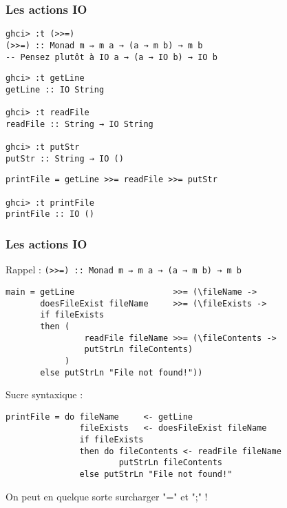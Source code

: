 \documentclass[10pt]{beamer}
\begin{document}
\begin{frame}[fragile]
\frametitle{Les actions IO}
\begin{verbatim}
ghci> :t (>>=)
(>>=) :: Monad m ⇒ m a → (a → m b) → m b
-- Pensez plutôt à IO a → (a → IO b) → IO b
\end{verbatim}
\pause
\begin{verbatim}
ghci> :t getLine
getLine :: IO String

ghci> :t readFile
readFile :: String → IO String

ghci> :t putStr
putStr :: String → IO ()
\end{verbatim}
\pause
\begin{verbatim}
printFile = getLine >>= readFile >>= putStr

ghci> :t printFile
printFile :: IO ()
\end{verbatim}
\end{frame}



\begin{frame}[fragile]
\frametitle{Les actions IO}

Rappel : \verb|(>>=) :: Monad m ⇒ m a → (a → m b) → m b|

\begin{verbatim}
main = getLine                    >>= (\fileName ->
       doesFileExist fileName     >>= (\fileExists ->
       if fileExists
       then (
                readFile fileName >>= (\fileContents ->
                putStrLn fileContents)
            )
       else putStrLn "File not found!"))
\end{verbatim}

\pause

Sucre syntaxique :

\begin{verbatim}
printFile = do fileName     <- getLine
               fileExists   <- doesFileExist fileName
               if fileExists
               then do fileContents <- readFile fileName
                       putStrLn fileContents
               else putStrLn "File not found!"
\end{verbatim}

On peut en quelque sorte surcharger "=" et ";" !

\end{frame}
\end{document}
